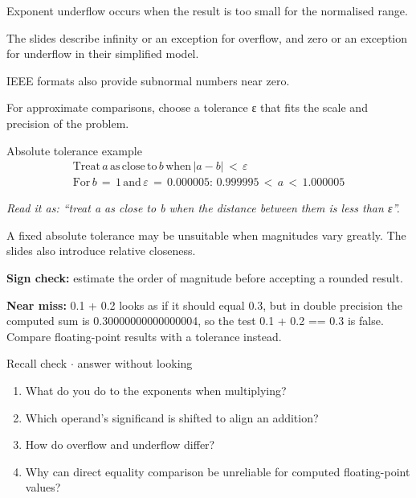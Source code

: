 \documentclass[11pt]{article}
\begin{document}
\begin{keepsection}
\begin{keepsection}
Exponent underflow occurs when the result is too small for the normalised range.

The slides describe infinity or an exception for overflow, and zero or an exception for underflow in their simplified model.

IEEE formats also provide subnormal numbers near zero.

For approximate comparisons, choose a tolerance ε that fits the scale and precision of the problem.

\begin{equationcard}{Absolute tolerance example}
\[ \begin{gathered} \text{Treat}\, {a}\, \text{as}\, \text{close}\, \text{to}\, {b}\, \text{when}\, |{a}-{b}|\, <\, ε \\ \text{For}\, {b}\, =\, 1\, \text{and}\, ε\, =\, 0.000005:\, 0.999995\, <\, {a}\, <\, 1.000005 \end{gathered} \]
{\small \emph{Read it as: “treat a as close to b when the distance between them is less than ε”.}\par A fixed absolute tolerance may be unsuitable when magnitudes vary greatly. The slides also introduce relative closeness.}
\end{equationcard}

\begin{notebox}\textbf{Sign check:} estimate the order of magnitude before accepting a rounded result.\end{notebox}

\begin{notebox}\textbf{Near miss:} 0.1 + 0.2 looks as if it should equal 0.3, but in double precision the computed sum is 0.30000000000000004, so the test 0.1 + 0.2 == 0.3 is false. Compare floating-point results with a tolerance instead.\end{notebox}

\begin{recallbox}{Recall check \ensuremath{\cdot} answer without looking}
\begin{enumerate}
\item What do you do to the exponents when multiplying?
\item Which operand’s significand is shifted to align an addition?
\item How do overflow and underflow differ?
\item Why can direct equality comparison be unreliable for computed floating-point values?
\end{enumerate}

\end{recallbox}
\end{keepsection}
\end{keepsection}
\end{document}
